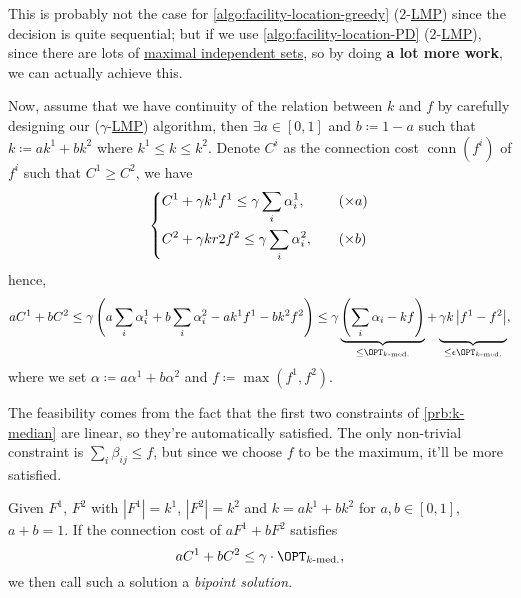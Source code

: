 \begin{remark}
	This is probably not the case for \autoref{algo:facility-location-greedy} (\(2\)-\hyperref[def:LMP]{LMP}) since the decision is quite sequential; but if we use \autoref{algo:facility-location-PD} (\(2\)-\hyperref[def:LMP]{LMP}), since there are lots of \hyperref[prb:max-strongly-independent-set]{maximal independent sets}, so by doing \textbf{a lot more work}, we can actually achieve this.
\end{remark}

Now, assume that we have continuity of the relation between \(k\) and \(f\) by carefully designing our (\(\gamma\)-\hyperref[def:LMP]{LMP}) algorithm, then \(\exists a\in [0, 1]\) and \(b \coloneqq 1 - a\) such that \(k \coloneqq ak^1 + bk^2\) where \(k^1 \leq k \leq k^2\). Denote \(C^i\) as the connection cost \(\mathop{\mathrm{conn}}(f^i)\) of \(f^i\) such that \(C^1 \geq C^2\), we have
\[
	\begin{dcases}
		C^1 + \gamma k^1 f^1 \leq \gamma \sum_{i} \alpha _i^1, & \quad (\times a) \\
		C^2 + \gamma kr2 f^2 \leq \gamma \sum_{i} \alpha _i^2, & \quad (\times b)
	\end{dcases}
\]
hence,
\[
	aC^1 + bC^2
	\leq \gamma \left( a \sum_{i} \alpha _i^1 + b \sum_{i} \alpha _i^2 - ak^1 f^1 - bk^2 f^2 \right)
	\leq \gamma \underbrace{\left( \sum_{i} \alpha _i - kf \right)}_{\leq \OPT_{\text{\(k\)-med.}}} + \underbrace{\vphantom{\left( \sum_{i} \alpha _i - kf \right)}\gamma k \left\vert f^1 - f^2 \right\vert}_{\leq \epsilon \OPT_{\text{\(k\)-med.}}},
\]
where we set \(\alpha \coloneqq a \alpha ^1 + b \alpha ^2\) and \(f \coloneqq \max (f^1, f^2)\).

\begin{explanation}
	The feasibility comes from the fact that the first two constraints of \autoref{prb:k-median} are linear, so they're automatically satisfied. The only non-trivial constraint is \(\sum_{i} \beta _{ij} \leq f\), but since we choose \(f\) to be the maximum, it'll be more satisfied.
\end{explanation}

\begin{definition}\label{def:bipoint-solution}
	Given \(F^1\), \(F^2\) with \(\left\vert F^1 \right\vert = k^1\), \(\left\vert F^2 \right\vert = k^2\) and \(k=ak^1 + bk^2\) for \(a, b\in [0, 1]\), \(a + b = 1\). If the connection cost of \(aF^1 + b F^2\) satisfies
	\[
		a C^1 + b C^2 \leq \gamma \cdot \OPT_{\text{\(k\)-med.}},
	\]
	we then call such a solution a \emph{bipoint solution}.
\end{definition}

